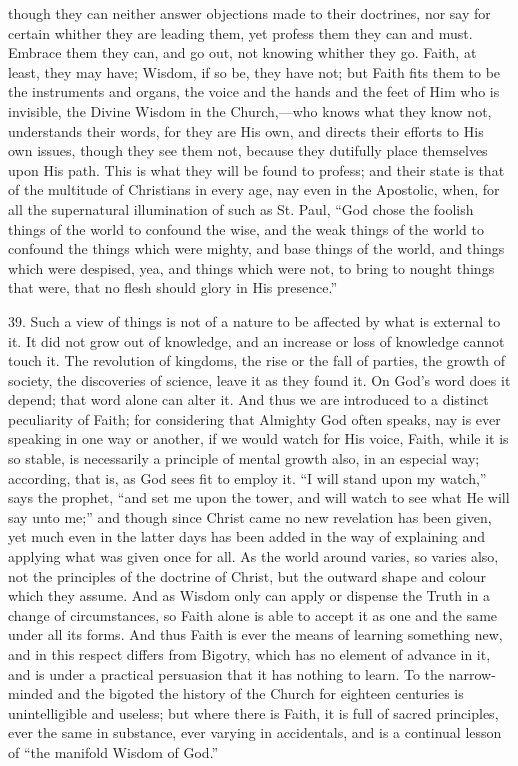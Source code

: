 though they can neither answer objections made to their doctrines, nor
say for certain whither they are leading them, yet profess them they
can and must. Embrace them they can, and go out, not knowing whither
they go. Faith, at least, they may have; Wisdom, if so be, they have
not; but Faith fits them to be the instruments and organs, the voice
and the hands and the feet of Him who is invisible, the Divine Wisdom
in the Church,—who knows what they know not, understands their
words, for they are His own, and directs their efforts to His own
issues, though they see them not, because they dutifully place
themselves upon His path. This is what they will be found to profess;
and their state is that of the multitude of Christians in every age,
nay even in the Apostolic, when, for all the supernatural illumination
of such as St. Paul, ``God chose the foolish things of the world
to confound the wise, and the weak things of the world to confound the
things which were mighty, and base things of the world, and things
which were despised, yea, and things which were not, to bring to
nought things that were, that no flesh should glory in His
presence.''

39. Such a view of things is not of a nature to be affected by what
is external to it. It did not grow out of knowledge, and an increase
or loss of knowledge cannot touch it. The revolution of kingdoms, the
rise or the fall of parties, the growth of society, the discoveries of
science, leave it as they found it. On God's word does it depend; that
word alone can alter it. And thus we are introduced to a distinct
peculiarity of Faith; for considering that Almighty God often speaks,
nay is ever speaking in one way or another, if we would watch for His
voice, Faith, while it is so stable, is necessarily a principle of
mental growth also, in an especial way; according, that is, as God
sees fit to employ it. ``I will stand upon my watch,'' says
the prophet, ``and set me upon the tower, and will watch to see
what He will say unto me;'' and though since Christ came no new
revelation has been given, yet much even in the latter days has been
added in the way of explaining and applying what was given once for
all. As the world around varies, so varies also, not the principles of
the doctrine of Christ, but the outward shape and colour which they
assume. And as Wisdom only can apply or dispense the Truth in a change
of circumstances, so Faith alone is able to accept it as one and the
same under all its forms. And thus Faith is ever the means of learning
something new, and in this respect differs from Bigotry, which has no
element of advance in it, and is under a practical persuasion that it
has nothing to learn. To the narrow-minded and the bigoted the history
of the Church for eighteen centuries is unintelligible and useless;
but where there is Faith, it is full of sacred principles, ever the
same in substance, ever varying in accidentals, and is a continual
lesson of ``the manifold Wisdom of God.''

